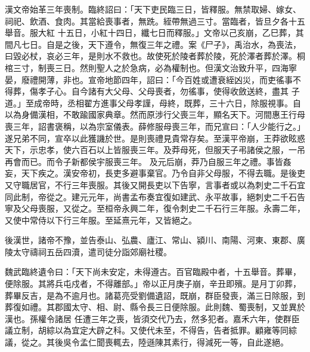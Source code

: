 \begin{pinyinscope}
 漢文帝始革三年喪制。臨終詔曰：「天下吏民臨三日，皆釋服。無禁取婦、嫁女、祠祀、飲酒、食肉。其當給喪事者，無跣。絰帶無過三寸。當臨者，皆旦夕各十五舉音。服大紅
 十五日，小紅十四日，纖七日而釋服。」文帝以己亥崩，乙巳葬，其間凡七日。自是之後，天下遵令，無復三年之禮。案《尸子》，禹治水，為喪法，曰毀必杖，哀必三年，是則水不救也。故使死於陵者葬於陵，死於澤者葬於澤。桐棺三寸，制喪三日。然則聖人之於急病，必為權制也。但漢文治致升平，四海寧晏，廢禮開薄，非也。宣帝地節四年，詔曰：「今百姓或遭衰絰凶災，而吏徭事不得葬，傷孝子心。自今諸有大父母、父母喪者，勿徭事，使得收斂送終，盡其
 子道。」至成帝時，丞相翟方進事父母孝謹，母終，既葬，三十六日，除服視事。自以為身備漢相，不敢踰國家典章。然而原涉行父喪三年，顯名天下。河間惠王行母喪三年，詔書褒稱，以為宗室儀表。薛修服母喪三年，而兄宣曰：「人少能行之。」遂兄弟不同，宣卒以此獲譏於世。是則喪禮見貴常存矣。至漢平帝崩，王莽欲眩惑天下，示忠孝，使六百石以上皆服喪三年。及莽母死，但服天子弔諸侯之服，一吊再會而已。而令子新都侯宇服喪三年。
 及元后崩，莽乃自服三年之禮。事皆姦妄，天下疾之。漢安帝初，長吏多避事棄官。乃令自非父母服，不得去職。是後吏又守職居官，不行三年喪服。其後又開長吏以下告寧，言事者或以為刺史二千石宜同此制，帝從之。建元元年，尚書孟布奏宜復如建武、永平故事，絕刺史二千石告寧及父母喪服，又從之。至桓帝永興二年，復令刺史二千石行三年服。永壽二年，又使中常侍以下行三年服。至延熹元年，又皆絕之。



 後漢世，諸帝不豫，並告泰山、弘農、廬江、常山、潁川、南陽、河東、東郡、廣陵太守禱祠五岳四瀆，遣司徒分詣郊廟社稷。



 魏武臨終遺令曰：「天下尚未安定，未得遵古。百官臨殿中者，十五舉音。葬畢，便除服。其將兵屯戍者，不得離部。」帝以正月庚子崩，辛丑即殯。是月丁卯葬，葬畢反吉，是為不逾月也。諸葛亮受劉備遺詔，既崩，群臣發喪，滿三日除服，到葬復如禮。其郡國太守、相、尉、縣令長三日便除服。此則魏、蜀喪制，又並異於漢也。孫權令諸居
 任遭三年之喪，皆須交代乃去，然多犯者。嘉禾六年，使群臣議立制，胡綜以為宜定大辟之科。又使代未至，不得告，告者抵罪。顧雍等同綜議，從之。其後吳令孟仁聞喪輒去，陸遜陳其素行，得減死一等，自此遂絕。




\end{pinyinscope}

